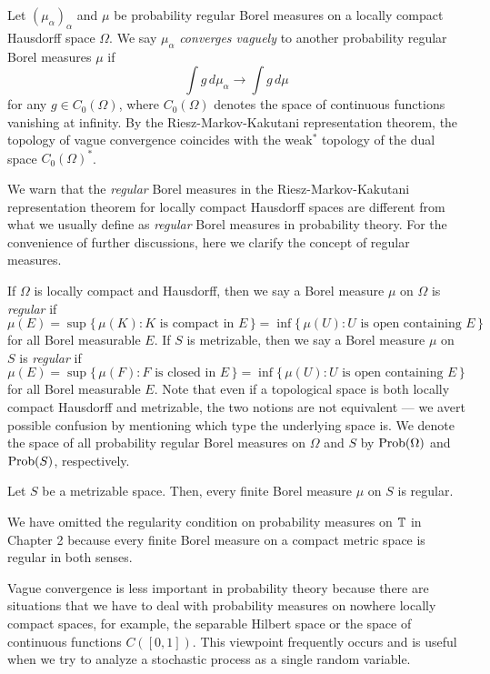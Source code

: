 \documentclass[a4paper]{article}
\begin{document}
\begin{defn}
Let $(\mu_\alpha)_\alpha$ and $\mu$ be probability regular Borel measures on a locally compact Hausdorff space $\Omega$.
We say $\mu_\alpha$ \emph{converges vaguely} to another probability regular Borel measures $\mu$ if
\[\int g\,d\mu_\alpha\to\int g\,d\mu\]
for any $g\in C_0(\Omega)$, where $C_0(\Omega)$ denotes the space of continuous functions vanishing at infinity.
By the Riesz-Markov-Kakutani representation theorem, the topology of vague convergence coincides with the weak$^*$ topology of the dual space $C_0(\Omega)^*$.
\end{defn}

We warn that the \emph{regular} Borel measures in the Riesz-Markov-Kakutani representation theorem for locally compact Hausdorff spaces are different from what we usually define as \emph{regular} Borel measures in probability theory.
For the convenience of further discussions, here we clarify the concept of regular measures.

\begin{defn}
If $\Omega$ is locally compact and Hausdorff, then we say a Borel measure $\mu$ on $\Omega$ is \emph{regular} if
\[\mu(E)=\sup\{\,\mu(K):K\text{ is compact in }E\,\}
=\inf\{\,\mu(U):U\text{ is open containing }E\,\}\]
for all Borel measurable $E$.
If $S$ is metrizable, then we say a Borel measure $\mu$ on $S$ is \emph{regular} if
\[\mu(E)=\sup\{\,\mu(F):F\text{ is closed in }E\,\}
=\inf\{\,\mu(U):U\text{ is open containing }E\,\}\]
for all Borel measurable $E$.
Note that even if a topological space is both locally compact Hausdorff and metrizable, the two notions are not equivalent --- we avert possible confusion by mentioning which type the underlying space is.
We denote the space of all probability regular Borel measures on $\Omega$ and $S$ by $\operatorname{Prob}(\Omega)$ and $\operatorname{Prob}(S)$, respectively.
\end{defn}

\begin{lem}
Let $S$ be a metrizable space.
Then, every finite Borel measure $\mu$ on $S$ is regular.
\end{lem}

We have omitted the regularity condition on probability measures on $\mathbb{T}$ in Chapter 2 because every finite Borel measure on a compact metric space is regular in both senses.

Vague convergence is less important in probability theory because there are situations that we have to deal with probability measures on nowhere locally compact spaces, for example, the separable Hilbert space or the space of continuous functions $C([0,1])$.
This viewpoint frequently occurs and is useful when we try to analyze a stochastic process as a single random variable.
\end{document}
